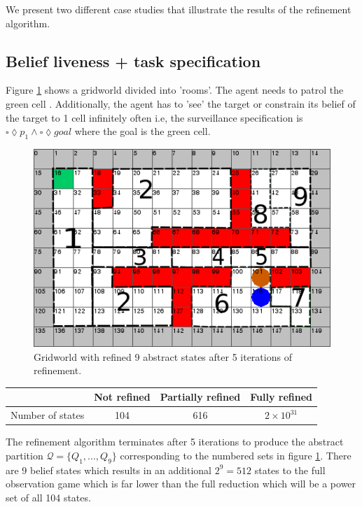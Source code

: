 We present two different case studies that illustrate the results of the refinement algorithm. 

\subsection{Belief liveness + task specification}
Figure \ref{fig:case1} shows a gridworld divided into 'rooms'. The agent needs to patrol the green cell . Additionally, the agent has to 'see' the target or constrain its belief of the target to 1 cell infinitely often i.e, the surveillance specification is $\square \lozenge p_1 \wedge \square \lozenge goal$ where the goal is the green cell. 

\begin{figure}
\centering
\includegraphics[scale=0.4]{text970.png}\caption{Gridworld with refined 9 abstract states after 5 iterations of refinement.}\label{fig:case1}
\vspace{-.5cm}
\end{figure}

\begin{table}[h!]
\begin{tabular}{c|c|c|c}
& Not refined & Partially refined & Fully refined \\ \hline \hline
Number of states & 104 & 616 & $2\times10^{31}$
\end{tabular}
\end{table}
The refinement algorithm terminates after 5 iterations to produce the abstract partition $\mathcal{Q} = \{Q_1,...,Q_9 \}$ corresponding to the numbered sets in figure \ref{fig:case1}. There are 9 belief states which results in an additional $2^9 = 512$ states to the full observation game which is far lower than the full reduction which will be a power set of all 104 states.

